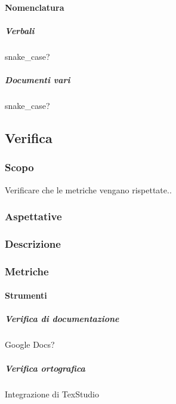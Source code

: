 			\paragraph{Nomenclatura}
			
			\subparagraph{Verbali}
			snake\_case?
				
			\subparagraph{Documenti vari}	
			snake\_case?

	\subsection{Verifica}
		
		\subsubsection{Scopo}
		Verificare che le metriche vengano rispettate..
		
		\subsubsection{Aspettative}
		
		\subsubsection{Descrizione}
		
		\subsubsection{Metriche}
		
			
			
			
			\paragraph{Strumenti}
			
			\subparagraph{Verifica di documentazione}
			Google Docs?
			
			\subparagraph{Verifica ortografica}
			Integrazione di TexStudio
			

